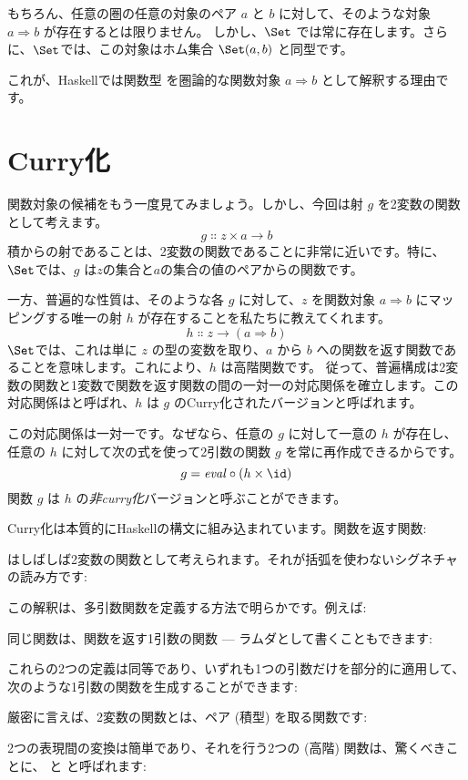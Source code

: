 \noindent
もちろん、任意の圏の任意の対象のペア $a$ と $b$ に対して、そのような対象 $a \Rightarrow b$ が存在するとは限りません。
しかし、$\Set$ では常に存在します。さらに、$\Set$では、この対象はホム集合 $\Set(a, b)$ と同型です。

これが、Haskellでは関数型  を圏論的な関数対象 $a \Rightarrow b$ として解釈する理由です。

\section{Curry化}

関数対象の候補をもう一度見てみましょう。しかし、今回は射 $g$ を2変数の関数として考えます。
\[g \Colon z \times a \to b\]
積からの射であることは、2変数の関数であることに非常に近いです。特に、$\Set$では、$g$ は$z$の集合と$a$の集合の値のペアからの関数です。

一方、普遍的な性質は、そのような各 $g$ に対して、$z$ を関数対象 $a \Rightarrow b$ にマッピングする唯一の射 $h$ が存在することを私たちに教えてくれます。
\[h \Colon z \to (a \Rightarrow b)\]
$\Set$では、これは単に $z$ の型の変数を取り、$a$ から $b$ への関数を返す関数であることを意味します。これにより、$h$ は高階関数です。
従って、普遍構成は2変数の関数と1変数で関数を返す関数の間の一対一の対応関係を確立します。この対応関係はと呼ばれ、$h$ は $g$ のCurry化されたバージョンと呼ばれます。

この対応関係は一対一です。なぜなら、任意の $g$ に対して一意の $h$ が存在し、任意の $h$ に対して次の式を使って2引数の関数 $g$ を常に再作成できるからです。
\[g = \mathit{eval} \circ (h \times \id)\]
関数 $g$ は $h$ の\emph{非curry化}バージョンと呼ぶことができます。

Curry化は本質的にHaskellの構文に組み込まれています。関数を返す関数: 

はしばしば2変数の関数として考えられます。それが括弧を使わないシグネチャの読み方です: 

この解釈は、多引数関数を定義する方法で明らかです。例えば: 

同じ関数は、関数を返す1引数の関数 --- ラムダとして書くこともできます: 

これらの2つの定義は同等であり、いずれも1つの引数だけを部分的に適用して、次のような1引数の関数を生成することができます: 

厳密に言えば、2変数の関数とは、ペア (積型) を取る関数です: 

2つの表現間の変換は簡単であり、それを行う2つの (高階) 関数は、驚くべきことに、 と  と呼ばれます: 

